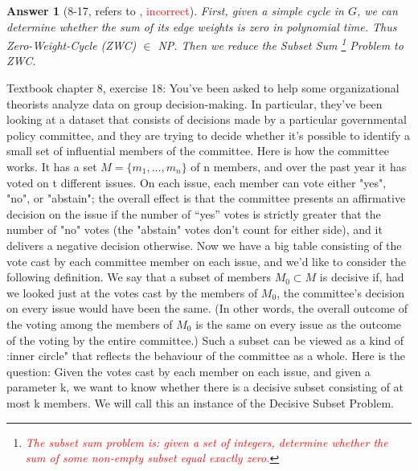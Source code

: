 \documentclass[11pt]{article}
\theoremstyle{numberplain}
\theoremstyle{nonumberplain}
\newtheorem{ans}{Answer}
\newcommand{\0}{{\mathbf{0}}}
\begin{document}
\begin{ans}[8-17, refers to \cite{cmu_cs_8_17}, \textcolor{red}{incorrect}]
 First, given a simple cycle in $G$, we can determine whether the sum of its edge weights is zero in polynomial time. Thus Zero-Weight-Cycle (ZWC) $\in$ NP. Then we reduce the Subset Sum
 \footnote{\textcolor{red}{The subset sum problem is: given a set of integers, determine whether the sum of some non-empty subset equal exactly zero.}} 
 Problem to ZWC. 

\end{ans}
\begin{ques}[8-18] Textbook chapter 8, exercise 18: You’ve been asked to help some organizational theorists analyze data on group decision-making. In particular, they’ve been looking at a dataset that consists of decisions made by a particular governmental policy committee, and they are trying to decide whether it’s possible to identify a small set of influential members of the committee. Here is how the committee works. It has a set $M = \{m_1,\ldots,m_n\}$ of n members, and over the past year it has voted on t different issues. On each issue, each member can vote either "yes", "no", or "abstain"; the overall effect is that the committee presents an affirmative decision on the issue if the number of “yes” votes is strictly greater that the number of "no" votes (the "abstain" votes don't count for either side), and it delivers a negative decision otherwise. Now we have a big table consisting of the vote cast by each committee member on each issue, and we'd like to consider the following definition. We say that a subset of members $M_0 \subset M$ is decisive if, had we looked just at the votes cast by the members of $M_0$, the committee's decision on every issue would have been the same. (In other words, the overall outcome of the voting among the members of $M_0$ is the same on every issue as the outcome of the voting by the entire committee.) Such a subset can be viewed as a kind of :inner circle" that reflects the behaviour of the committee as a whole. Here is the question: Given the votes cast by each member on each issue, and given a parameter k, we want to know whether there is a decisive subset consisting of at most k members. We will call this an instance of the Decisive Subset Problem. 
\end{ques}
\end{document}

